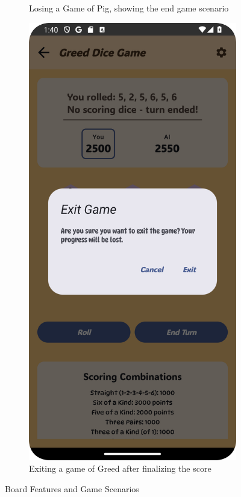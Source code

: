 \begin{figure}[ht!]
\begin{subfigure}[b]{0.27\textwidth}
        \caption{Losing a Game of Pig, showing the end game scenario}
    \end{subfigure}
    \hfill
    \begin{subfigure}[b]{0.27\textwidth}
        \includegraphics[width=\textwidth]{img/greed board2.png}
        \caption{Exiting a game of Greed after finalizing the score}
    \end{subfigure}
    \caption{Board Features and Game Scenarios}
    \label{fig:additional_features}
\end{figure}
